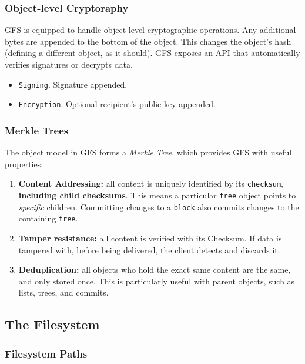 \documentclass{sig-alternate}
\begin{document}
\subsubsection{Object-level Cryptoraphy}

GFS is equipped to handle object-level cryptographic operations. Any additional
bytes are appended to the bottom of the object. This changes the object's hash
(defining a different object, as it should). GFS exposes an API that
automatically verifies signatures or decrypts data.

\begin{itemize}
  \item \texttt{Signing}. Signature appended.
  \item \texttt{Encryption}. Optional recipient's public key appended.
\end{itemize}

\subsubsection{Merkle Trees}

The object model in GFS forms a \textit{Merkle Tree}, which provides GFS with
useful properties:

\begin{enumerate}
  \item \textbf{Content Addressing:} all content is uniquely identified by its
        \texttt{checksum}, \textbf{including child checksums}. This means a
        particular \texttt{tree} object points to \textit{specific} children.
        Committing changes to a \texttt{block} also commits changes to the
        containing \texttt{tree}.
  \item \textbf{Tamper resistance:} all content is verified with its Checksum.
        If data is tampered with, before being delivered, the client
        detects and discards it.
  \item \textbf{Deduplication:} all objects who hold the exact same content
        are the same, and only stored once. This is particularly useful with
        parent objects, such as lists, trees, and commits.
\end{enumerate}


\subsection{The Filesystem}

\subsubsection{Filesystem Paths}
\end{document}
